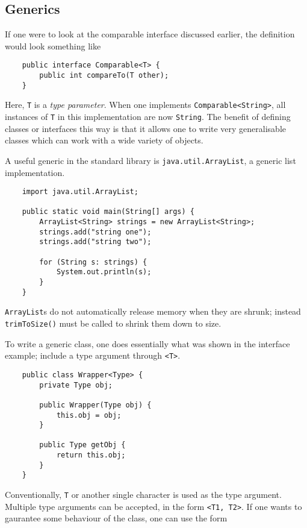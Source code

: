 \documentclass[12pt]{report}
\newcommand{\code}[1]{\lstinline{#1}}
\begin{document}
\begin{flushleft}
\subsection*{Generics}

If one were to look at the comparable interface discussed earlier, the
definition would look something like

\begin{lstlisting}
    public interface Comparable<T> {
        public int compareTo(T other);
    }
\end{lstlisting}

Here, \code{T} is a \textit{type parameter}. When one implements
\code{Comparable<String>}, all instances of \code{T} in this implementation
are now \code{String}. The benefit of defining classes or interfaces this way
is that it allows one to write very generalisable classes which can work with
a wide variety of objects. \par
A useful generic in the standard library is \code{java.util.ArrayList}, a
generic list implementation.

\begin{lstlisting}
    import java.util.ArrayList;

    public static void main(String[] args) {
        ArrayList<String> strings = new ArrayList<String>;
        strings.add("string one");
        strings.add("string two");

        for (String s: strings) {
            System.out.println(s);
        }
    }
\end{lstlisting}

\code{ArrayList}s do not automatically release memory when they are shrunk;
instead \code{trimToSize()} must be called to shrink them down to size. \par
To write a generic class, one does essentially what was shown in the interface
example; include a type argument through \code{<T>}.

\begin{lstlisting}
    public class Wrapper<Type> {
        private Type obj;

        public Wrapper(Type obj) {
            this.obj = obj;
        }

        public Type getObj {
            return this.obj;
        }
    }
\end{lstlisting}

Conventionally, \code{T} or another single character is used as the type
argument. Multiple type arguments can be accepted, in the form
\code{<T1, T2>}. If one wants to gaurantee some behaviour of the class, one can
use the form


\end{flushleft}
\end{document}
